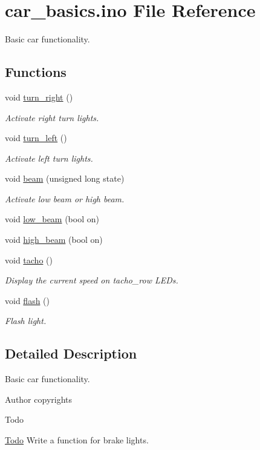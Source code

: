 \hypertarget{car__basics_8ino}{}\section{car\+\_\+basics.\+ino File Reference}
\label{car__basics_8ino}


Basic car functionality.  


\subsection*{Functions}
{\bf }\par
\begin{DoxyCompactItemize}
\item 
void \hyperlink{group__car_gaca3b725ebee32d3719a9c02b41002ea3}{turn\+\_\+right} ()
\begin{DoxyCompactList}\small\item\em Activate right turn lights. \end{DoxyCompactList}\item 
void \hyperlink{group__car_ga0565ad7a822d9d334bb50c088af22361}{turn\+\_\+left} ()
\begin{DoxyCompactList}\small\item\em Activate left turn lights. \end{DoxyCompactList}\item 
void \hyperlink{group__car_ga6b1fd674445dd1c654dfe8b8b65f168e}{beam} (unsigned long state)
\begin{DoxyCompactList}\small\item\em Activate low beam or high beam. \end{DoxyCompactList}\item 
void \hyperlink{group__car_ga29d5eff542aae0196b8e84b8a752e1df}{low\+\_\+beam} (bool on)
\item 
void \hyperlink{group__car_ga1088d06b4ab015d579e0ac2510d39f25}{high\+\_\+beam} (bool on)
\item 
void \hyperlink{group__car_gac7295d1018b2b948084ba5dbacf09d74}{tacho} ()
\begin{DoxyCompactList}\small\item\em Display the current speed on tacho\+\_\+row L\+E\+Ds. \end{DoxyCompactList}\item 
void \hyperlink{group__car_gaffb7c011f82f3fb47b39ebb2713a1cd8}{flash} ()
\begin{DoxyCompactList}\small\item\em Flash light. \end{DoxyCompactList}\end{DoxyCompactItemize}



\subsection{Detailed Description}
Basic car functionality. 

\begin{DoxyAuthor}{Author}
copyrights 
\end{DoxyAuthor}
\begin{DoxyRefDesc}{Todo}
\item[\hyperlink{todo__todo000001}{Todo}]Write a function for brake lights. \end{DoxyRefDesc}
